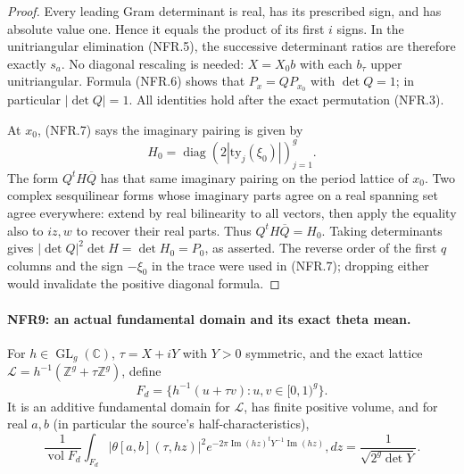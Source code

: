 \begin{proof}
Every leading Gram determinant is real, has its prescribed sign,
and has absolute value one.  Hence it equals the product of its
first $i$ signs.  In the unitriangular elimination (NFR.5), the
successive determinant ratios are therefore exactly $s_a$.
No diagonal rescaling is needed: $X=X_0b$ with each $b_\tau$
upper unitriangular.  Formula (NFR.6) shows that
$P_x=Q P_{x_0}$ with $\det Q=1$; in particular $|\det Q|=1$.
All identities hold after the exact permutation (NFR.3).

At $x_0$, (NFR.7) says the imaginary pairing is given by
\[
              H_0=\operatorname{diag}
                           (2|\mathrm{ty}_j(\xi_0)|)_{j=1}^g.
\]
The form $Q^tH\overline Q$ has that same imaginary pairing on
the period lattice of $x_0$.  Two complex sesquilinear forms
whose imaginary parts agree on a real spanning set agree
everywhere: extend by real bilinearity to all vectors, then
apply the equality also to $iz,w$ to recover their real parts.
Thus $Q^tH\overline Q=H_0$.
Taking determinants gives $|\det Q|^2\det H=\det H_0=P_0$,
as asserted.  The reverse order of the first $q$ columns and
the sign $-\xi_0$ in the trace were used in (NFR.7); dropping
either would invalidate the positive diagonal formula.
\end{proof}

\paragraph{NFR9: an actual fundamental domain and its exact theta mean.}
\label{claim:NFR9}
For $h\in\operatorname{GL}_g(\mathbb C)$, $\tau=X+iY$ with
$Y>0$ symmetric, and the exact lattice
$\mathcal L=h^{-1}(\mathbb Z^g+\tau\mathbb Z^g)$, define
\[
 F_d=\{h^{-1}(u+\tau v):u,v\in[0,1)^g\}.
\]
It is an additive fundamental domain for $\mathcal L$, has finite
positive volume, and for real $a,b$ (in particular the source's
half-characteristics),
\[
 \frac1{\operatorname{vol}F_d}\int_{F_d}
   |\theta[a,b](\tau,hz)|^2
    e^{-2\pi\operatorname{Im}(hz)^tY^{-1}\operatorname{Im}(hz)},dz
                       =\frac1{\sqrt{2^g\det Y}}.
 \tag{NFR.17}
\]

